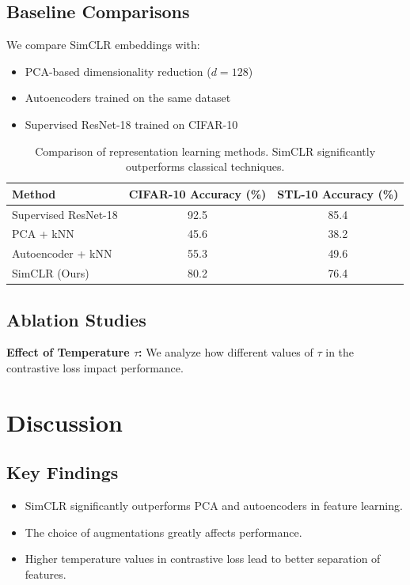 \documentclass[11pt]{article}
\begin{document}
\subsection{Baseline Comparisons}
We compare SimCLR embeddings with:
\begin{itemize}
  \item PCA-based dimensionality reduction ($d = 128$)
  \item Autoencoders trained on the same dataset
  \item Supervised ResNet-18 trained on CIFAR-10
\end{itemize}

\begin{table}[h]
\centering
\begin{tabular}{lcc}
\toprule
Method & CIFAR-10 Accuracy (\%) & STL-10 Accuracy (\%) \\
\midrule
Supervised ResNet-18 & 92.5 & 85.4 \\
PCA + kNN & 45.6 & 38.2 \\
Autoencoder + kNN & 55.3 & 49.6 \\
SimCLR (Ours) & 80.2 & 76.4 \\
\bottomrule
\end{tabular}
\caption{Comparison of representation learning methods. SimCLR significantly outperforms classical techniques.}
\end{table}

\subsection{Ablation Studies}
\textbf{Effect of Temperature $\tau$:} We analyze how different values of $\tau$ in the contrastive loss impact performance.

\section{Discussion}

\subsection{Key Findings}
\begin{itemize}
  \item SimCLR significantly outperforms PCA and autoencoders in feature learning.
  \item The choice of augmentations greatly affects performance.
  \item Higher temperature values in contrastive loss lead to better separation of features.
\end{itemize}
\end{document}
